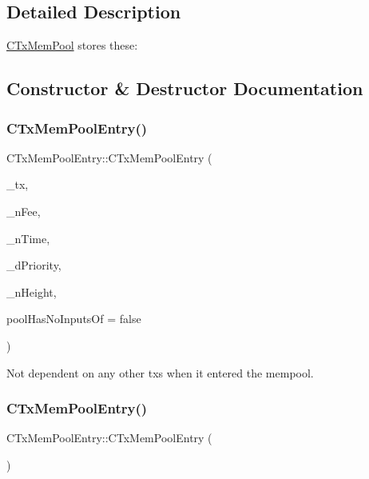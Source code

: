 \subsection{Detailed Description}
\mbox{\hyperlink{class_c_tx_mem_pool}{C\+Tx\+Mem\+Pool}} stores these\+: 

\subsection{Constructor \& Destructor Documentation}
\mbox{\label{class_c_tx_mem_pool_entry_a7867674ecd833e9344d772bf19657768}} 
\subsubsection{\texorpdfstring{C\+Tx\+Mem\+Pool\+Entry()}{CTxMemPoolEntry()}\hspace{0.1cm}{\footnotesize\ttfamily [1/3]}}
{\footnotesize\ttfamily C\+Tx\+Mem\+Pool\+Entry\+::\+C\+Tx\+Mem\+Pool\+Entry (\begin{DoxyParamCaption}\item[{const C\+Transaction \&}]{\+\_\+tx,  }\item[{const \mbox{\hyperlink{amount_8h_a4eaf3a5239714d8c45b851527f7cb564}{C\+Amount}} \&}]{\+\_\+n\+Fee,  }\item[{int64\+\_\+t}]{\+\_\+n\+Time,  }\item[{double}]{\+\_\+d\+Priority,  }\item[{unsigned int}]{\+\_\+n\+Height,  }\item[{bool}]{pool\+Has\+No\+Inputs\+Of = {\ttfamily false} }\end{DoxyParamCaption})}



Not dependent on any other txs when it entered the mempool. 

\mbox{\label{class_c_tx_mem_pool_entry_a4a22f1c696136f99f5c296c90cf0406a}} 
\subsubsection{\texorpdfstring{C\+Tx\+Mem\+Pool\+Entry()}{CTxMemPoolEntry()}\hspace{0.1cm}{\footnotesize\ttfamily [2/3]}}
{\footnotesize\ttfamily C\+Tx\+Mem\+Pool\+Entry\+::\+C\+Tx\+Mem\+Pool\+Entry (\begin{DoxyParamCaption}{ }\end{DoxyParamCaption})}

